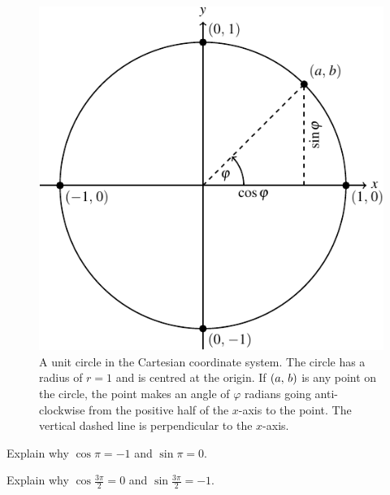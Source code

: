 \documentclass[a4paper,oneside,12pt]{article}
\begin{document}
\begin{figure}[!htbp]
\centering
\includegraphics[scale=1.1]{image/04/unit-circle.pdf}
\caption{%
  A unit circle in the Cartesian coordinate system.  The circle has a
  radius of $r = 1$ and is centred at the origin.  If $\left\lparen{a},\, {b}\right\rparen$
  is any point on the circle, the point makes an angle of $\varphi$
  radians going anti-clockwise from the positive half of the $x$-axis
  to the point.  The vertical dashed line is perpendicular to the
  $x$-axis.
}
\label{fig:point_on_unit_circle}
\end{figure}

\begin{exercise}
Explain why $\cos\pi = -1$ and $\sin\pi = 0$.
\end{exercise}


\begin{exercise}
\label{ex:cos_sin_270_degrees}
Explain why $\cos\frac{3\pi}{2} = 0$ and $\sin\frac{3\pi}{2} = -1$.
\end{exercise}
\end{document}
